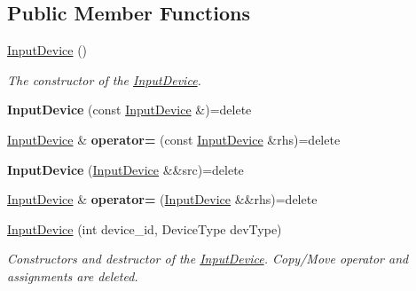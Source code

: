 \subsection*{Public Member Functions}
\begin{DoxyCompactItemize}
\item 
\mbox{\label{class_blade_1_1_input_device_af877cdfffd5ea76cfb3dd6ad06ad6c0d}} 
\hyperlink{class_blade_1_1_input_device_af877cdfffd5ea76cfb3dd6ad06ad6c0d}{Input\+Device} ()
\begin{DoxyCompactList}\small\item\em The constructor of the \hyperlink{class_blade_1_1_input_device}{Input\+Device}. \end{DoxyCompactList}\item 
\mbox{\label{class_blade_1_1_input_device_a15fe798555362cbdb43f24d6ffd6c6d5}} 
{\bfseries Input\+Device} (const \hyperlink{class_blade_1_1_input_device}{Input\+Device} \&)=delete
\item 
\mbox{\label{class_blade_1_1_input_device_a9df7cd958600cc44a020bf92998ac0a6}} 
\hyperlink{class_blade_1_1_input_device}{Input\+Device} \& {\bfseries operator=} (const \hyperlink{class_blade_1_1_input_device}{Input\+Device} \&rhs)=delete
\item 
\mbox{\label{class_blade_1_1_input_device_a4c17142daef8c51926d9c77a13c023e2}} 
{\bfseries Input\+Device} (\hyperlink{class_blade_1_1_input_device}{Input\+Device} \&\&src)=delete
\item 
\mbox{\label{class_blade_1_1_input_device_ac9b63f949dba2011abded48a1237d08f}} 
\hyperlink{class_blade_1_1_input_device}{Input\+Device} \& {\bfseries operator=} (\hyperlink{class_blade_1_1_input_device}{Input\+Device} \&\&rhs)=delete
\item 
\mbox{\label{class_blade_1_1_input_device_a3d54abe984387d8748ff4d8868bb458f}} 
\hyperlink{class_blade_1_1_input_device_a3d54abe984387d8748ff4d8868bb458f}{Input\+Device} (int device\+\_\+id, Device\+Type dev\+Type)
\begin{DoxyCompactList}\small\item\em Constructors and destructor of the \hyperlink{class_blade_1_1_input_device}{Input\+Device}. Copy/\+Move operator and assignments are deleted. \end{DoxyCompactList}\item 

\end{DoxyCompactItemize}
